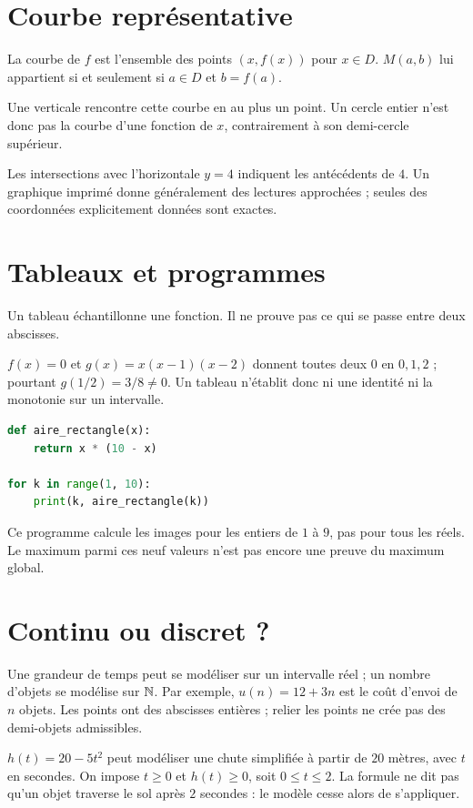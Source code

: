 \documentclass[../cours_2de.tex]{subfiles}
\begin{document}
\section{Courbe représentative}
\begin{definition}
La courbe de $f$ est l'ensemble des points $(x,f(x))$ pour $x\in D$.
$M(a,b)$ lui appartient si et seulement si $a\in D$ et $b=f(a)$.
\end{definition}
Une verticale rencontre cette courbe en au plus un point. Un cercle entier n'est donc pas la courbe d'une fonction de $x$, contrairement à son demi-cercle supérieur.
\begin{center}
\end{center}
Les intersections avec l'horizontale $y=4$ indiquent les antécédents de $4$.
Un graphique imprimé donne généralement des lectures approchées ; seules des coordonnées explicitement données sont exactes.
\section{Tableaux et programmes}
Un tableau échantillonne une fonction. Il ne prouve pas ce qui se passe entre deux abscisses.
\begin{exemple}
$f(x)=0$ et $g(x)=x(x-1)(x-2)$ donnent toutes deux $0$ en $0,1,2$ ; pourtant $g(1/2)=3/8\ne0$.
Un tableau n'établit donc ni une identité ni la monotonie sur un intervalle.
\end{exemple}
\begin{lstlisting}[language=Python]
def aire_rectangle(x):
    return x * (10 - x)

for k in range(1, 10):
    print(k, aire_rectangle(k))
\end{lstlisting}
Ce programme calcule les images pour les entiers de $1$ à $9$, pas pour tous les réels. Le maximum parmi ces neuf valeurs n'est pas encore une preuve du maximum global.
\section{Continu ou discret ?}
Une grandeur de temps peut se modéliser sur un intervalle réel ; un nombre d'objets se modélise sur $\mathbb{N}$.
Par exemple, $u(n)=12+3n$ est le coût d'envoi de $n$ objets. Les points ont des abscisses entières ; relier les points ne crée pas des demi-objets admissibles.
\begin{exemple}
$h(t)=20-5t^2$ peut modéliser une chute simplifiée à partir de $20$ mètres, avec $t$ en secondes.
On impose $t\geq0$ et $h(t)\geq0$, soit $0\leq t\leq2$.
La formule ne dit pas qu'un objet traverse le sol après $2$ secondes : le modèle cesse alors de s'appliquer.
\end{exemple}
\end{document}
